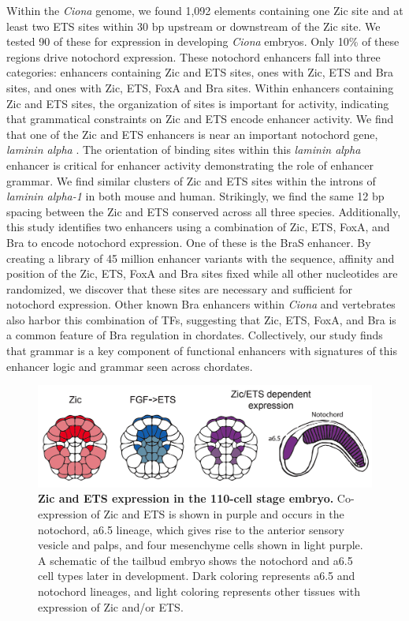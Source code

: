 Within the \textit{Ciona} genome, we found 1,092 elements containing one Zic site and at least two ETS sites within 30 bp upstream or downstream of the Zic site. We tested 90 of these for expression in developing \textit{Ciona} embryos. Only 10\% of these regions drive notochord expression. These notochord enhancers fall into three categories: enhancers containing Zic and ETS sites, ones with Zic, ETS and Bra sites, and ones with Zic, ETS, FoxA and Bra sites. Within enhancers containing Zic and ETS sites, the organization of sites is important for activity, indicating that grammatical constraints on Zic and ETS encode enhancer activity. We find that one of the Zic and ETS enhancers is near an important notochord gene, \textit{laminin alpha} \cite{veeman2008}. The orientation of binding sites within this \textit{laminin alpha} enhancer is critical for enhancer activity demonstrating the role of enhancer grammar.  We find similar clusters of Zic and ETS sites within the introns of \textit{laminin alpha-1} in both mouse and human. Strikingly, we find the same 12 bp spacing between the Zic and ETS conserved across all three species. Additionally, this study identifies two enhancers using a combination of Zic, ETS, FoxA, and Bra to encode notochord expression. One of these is the BraS enhancer. By creating a library of 45 million enhancer variants with the sequence, affinity and position of the Zic, ETS, FoxA and Bra sites fixed while all other nucleotides are randomized, we discover that these sites are necessary and sufficient for notochord expression. Other known Bra enhancers within \textit{Ciona} \cite{corbo1997} and vertebrates \cite{schifferl2021} also harbor this combination of TFs, suggesting that Zic, ETS, FoxA, and Bra is a common feature of Bra regulation in chordates. Collectively, our study finds that grammar is a key component of functional enhancers with signatures of this enhancer logic and grammar seen across chordates. 

\begin{figure}[h]
    \centering
    \includegraphics[scale=0.25]{2_figures/Fig1_ZicEts-Expression.png}
    \caption[Zic and ETS expression in the 110-cell stage embryo]{\textbf{Zic and ETS expression in the 110-cell stage embryo.} Co-expression of Zic and ETS is shown in purple and occurs in the notochord, a6.5 lineage, which gives rise to the anterior sensory vesicle and palps, and four mesenchyme cells shown in light purple. A schematic of the tailbud embryo shows the notochord and a6.5 cell types later in development. Dark coloring represents a6.5 and notochord lineages, and light coloring represents other tissues with expression of Zic and/or ETS.}
    \label{fig:1 zic ets expression}
\end{figure}

